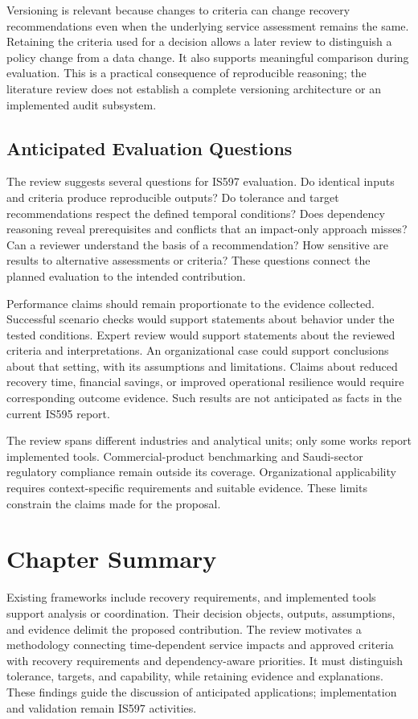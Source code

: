 Versioning is relevant because changes to criteria can change recovery recommendations even when the underlying service assessment remains the same. Retaining the criteria used for a decision allows a later review to distinguish a policy change from a data change. It also supports meaningful comparison during evaluation. This is a practical consequence of reproducible reasoning; the literature review does not establish a complete versioning architecture or an implemented audit subsystem.

\subsection{Anticipated Evaluation Questions}

The review suggests several questions for IS597 evaluation. Do identical inputs and criteria produce reproducible outputs? Do tolerance and target recommendations respect the defined temporal conditions? Does dependency reasoning reveal prerequisites and conflicts that an impact-only approach misses? Can a reviewer understand the basis of a recommendation? How sensitive are results to alternative assessments or criteria? These questions connect the planned evaluation to the intended contribution.

Performance claims should remain proportionate to the evidence collected. Successful scenario checks would support statements about behavior under the tested conditions. Expert review would support statements about the reviewed criteria and interpretations. An organizational case could support conclusions about that setting, with its assumptions and limitations. Claims about reduced recovery time, financial savings, or improved operational resilience would require corresponding outcome evidence. Such results are not anticipated as facts in the current IS595 report.

The review spans different industries and analytical units; only some works report implemented tools. Commercial-product benchmarking and Saudi-sector regulatory compliance remain outside its coverage. Organizational applicability requires context-specific requirements and suitable evidence. These limits constrain the claims made for the proposal.

\section{Chapter Summary}

Existing frameworks include recovery requirements, and implemented tools support analysis or coordination. Their decision objects, outputs, assumptions, and evidence delimit the proposed contribution. The review motivates a methodology connecting time-dependent service impacts and approved criteria with recovery requirements and dependency-aware priorities. It must distinguish tolerance, targets, and capability, while retaining evidence and explanations. These findings guide the discussion of anticipated applications; implementation and validation remain IS597 activities.
